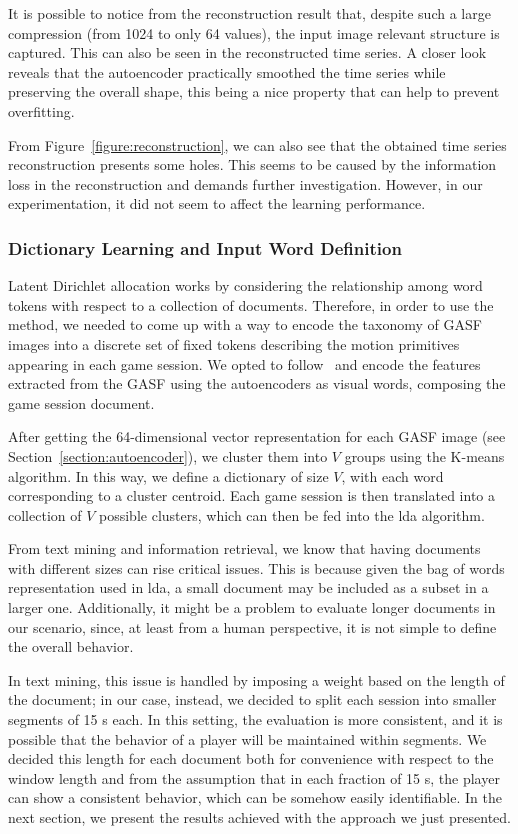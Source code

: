 {It is possible to notice from the reconstruction result that, despite such a large compression (from 1024 to only 64 values), the input image relevant structure is captured. This can also be seen in the reconstructed time series. A closer look reveals that the autoencoder practically smoothed the time series while preserving the overall shape, this being a nice property that can help to prevent overfitting.

From Figure~\ref{figure:reconstruction}, we can also see that the obtained time series reconstruction presents some holes. This seems to be caused by the information loss in the reconstruction and demands further investigation. However, in our experimentation, it did not seem to affect the learning performance. 

\subsubsection{Dictionary Learning and Input Word Definition}
Latent Dirichlet allocation works by considering the relationship among word tokens with respect to a collection of documents. Therefore, in order to use the method, we needed to come up with a way to encode the taxonomy of GASF images into a discrete set of fixed tokens describing the motion primitives appearing in each game session. We opted to follow~\cite{prince_computer_2012} and encode the features extracted from the GASF using the autoencoders as visual words, composing the game session document.

After getting the 64-dimensional vector representation for each GASF image (see Section~\ref{section:autoencoder}), we cluster them into $V$ groups using the K-means algorithm. In this way, we define a dictionary of size $V$, with each word corresponding to a cluster centroid. Each game session is then translated into a collection of $V$ possible clusters, which can then be fed into the \gls{lda} algorithm.

From text mining and information retrieval, we know that having documents with different sizes can rise critical issues. This is because given the bag of words representation used in \gls{lda}, a small document may be included as a subset in a larger one. Additionally, it might be a problem to evaluate longer documents in our scenario, since, at least from a human perspective, it is not simple to define the overall behavior. %

In text mining, this issue is handled by imposing a weight based on the length of the document; in our case, instead, we decided to split each session into smaller segments of 15 s each. In this setting, the evaluation is more consistent, and it is possible that the behavior of a player will be maintained within segments. We decided this length for each document both for convenience with respect to the window length and from the assumption that in each fraction of 15 s, the player can show a consistent behavior, which can be somehow easily identifiable. In the next section, we present the results achieved with the approach we just presented.

}
